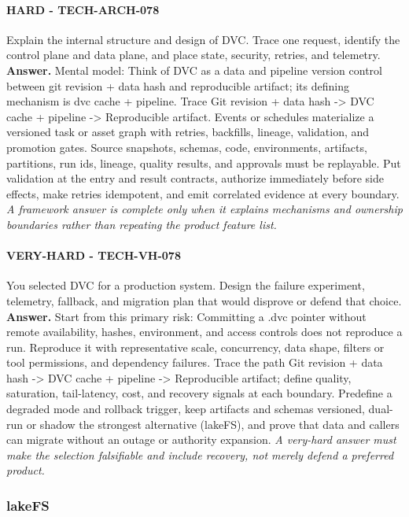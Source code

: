 \paragraph{HARD - TECH-ARCH-078} Explain the internal structure and design of DVC. Trace one request, identify the control plane and data plane, and place state, security, retries, and telemetry.
\textbf{Answer.} Mental model: Think of DVC as a data and pipeline version control between git revision + data hash and reproducible artifact; its defining mechanism is dvc cache + pipeline. Trace Git revision + data hash -> DVC cache + pipeline -> Reproducible artifact. Events or schedules materialize a versioned task or asset graph with retries, backfills, lineage, validation, and promotion gates. Source snapshots, schemas, code, environments, artifacts, partitions, run ids, lineage, quality results, and approvals must be replayable. Put validation at the entry and result contracts, authorize immediately before side effects, make retries idempotent, and emit correlated evidence at every boundary.
\textit{A framework answer is complete only when it explains mechanisms and ownership boundaries rather than repeating the product feature list.}
\paragraph{VERY-HARD - TECH-VH-078} You selected DVC for a production system. Design the failure experiment, telemetry, fallback, and migration plan that would disprove or defend that choice.
\textbf{Answer.} Start from this primary risk: Committing a .dvc pointer without remote availability, hashes, environment, and access controls does not reproduce a run. Reproduce it with representative scale, concurrency, data shape, filters or tool permissions, and dependency failures. Trace the path Git revision + data hash -> DVC cache + pipeline -> Reproducible artifact; define quality, saturation, tail-latency, cost, and recovery signals at each boundary. Predefine a degraded mode and rollback trigger, keep artifacts and schemas versioned, dual-run or shadow the strongest alternative (lakeFS), and prove that data and callers can migrate without an outage or authority expansion.
\textit{A very-hard answer must make the selection falsifiable and include recovery, not merely defend a preferred product.}
\subsubsection*{lakeFS}
